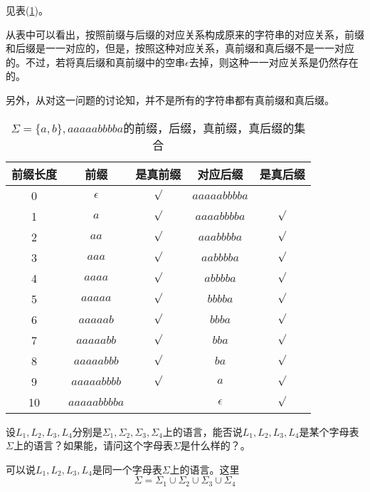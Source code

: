 \begin{solution}
	见表(\ref{tab:prepost})。
	
	从表中可以看出，按照前缀与后缀的对应关系构成原来的字符串的对应关系，前缀和后缀是一一对应的，但是，按照这种对应关系，真前缀和真后缀不是一一对应的。不过，若将真后缀和真前缀中的空串$\epsilon$去掉，则这种一一对应关系是仍然存在的。
	
	另外，从对这一问题的讨论知，并不是所有的字符串都有真前缀和真后缀。
	\begin{table}[htbp]
	\caption{$\Sigma=\{a,b\},aaaaabbbba$的前缀，后缀，真前缀，真后缀的集合}
	\label{tab:prepost}
	\begin{tabular}{|c|c|c|c|c|}
		\hline 
		前缀长度&前缀   &是真前缀  &对应后缀      &是真后缀  \\ 
		\hline 
		0&$\epsilon$   &$\surd$  &$aaaaabbbba$ &         \\ 
		\hline 
		1&$a$          &$\surd$  &$aaaabbbba$  &$\surd$  \\ 
		\hline 
		2&$aa$         &$\surd$  &$aaabbbba$   &$\surd$  \\ 
		\hline
	    3&$aaa$        &$\surd$  &$aabbbba$    &$\surd$  \\ 
		\hline
		4&$aaaa$       &$\surd$  &$abbbba$     &$\surd$  \\ 
		\hline
		5&$aaaaa$      &$\surd$  &$bbbba$      &$\surd$  \\
		\hline
		6&$aaaaab$     &$\surd$  &$bbba$       &$\surd$  \\ 
		\hline  
		7&$aaaaabb$    &$\surd$  &$bba$        &$\surd$  \\ 
		\hline
		8&$aaaaabbb$   &$\surd$  &$ba$         &$\surd$  \\ 
		\hline
		9&$aaaaabbbb$  &$\surd$  &$a$          &$\surd$  \\ 
		\hline
		10&$aaaaabbbba$&         &$\epsilon$   &$\surd$  \\ 
		\hline  
	\end{tabular} 
    \end{table}
\end{solution}

\begin{exercise}
	设$L_1,L_2,L_3,L_4$分别是$\Sigma_1,\Sigma_2,\Sigma_3,\Sigma_4$上的语言，能否说$L_1,L_2,L_3,L_4$是某个字母表$\Sigma$上的语言？如果能，请问这个字母表$\Sigma$是什么样的？。
\end{exercise}

\begin{solution}
	可以说$L_1,L_2,L_3,L_4$是同一个字母表$\Sigma$上的语言。这里
	$$\Sigma=\Sigma_1\cup\Sigma_2\cup\Sigma_3\cup\Sigma_4$$
\end{solution}

